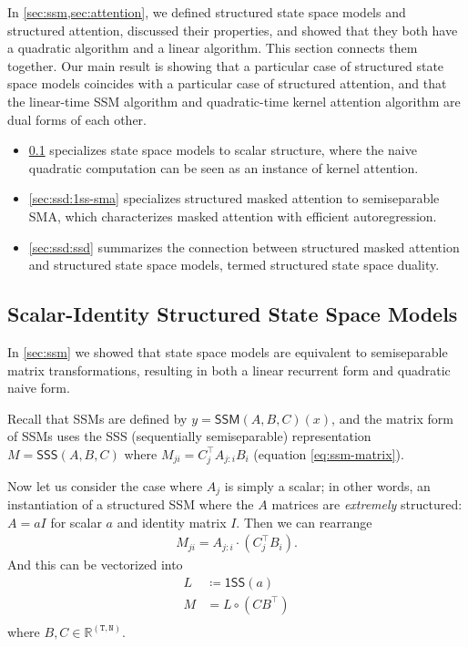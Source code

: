 \documentclass{article}
\newcommand{\R}{\mathbb{R}}
\begin{document}
In \cref{sec:ssm,sec:attention}, we defined structured state space models and structured attention,
discussed their properties, and showed that they both have a quadratic algorithm and a linear algorithm.
This section connects them together.
Our main result is showing that a particular case of structured state space models coincides with a particular case of structured attention,
and that the linear-time SSM algorithm and quadratic-time kernel attention algorithm are dual forms of each other.
\begin{itemize}
  \item \cref{sec:ssd:quadratic-ssm} specializes state space models to scalar structure, where the naive quadratic computation can be seen as an instance of kernel attention.
  \item \cref{sec:ssd:1ss-sma} specializes structured masked attention to semiseparable SMA, which characterizes masked attention with efficient autoregression.
  \item \cref{sec:ssd:ssd} summarizes the connection between structured masked attention and structured state space models, termed structured state space duality.
\end{itemize}

\subsection{Scalar-Identity Structured State Space Models}
\label{sec:ssd:quadratic-ssm}

In \cref{sec:ssm} we showed that state space models are equivalent to semiseparable matrix transformations,
resulting in both a linear recurrent form and quadratic naive form.

Recall that SSMs are defined by $y = \mathsf{SSM}(A, B, C)(x)$, and the matrix form of SSMs uses the SSS (sequentially semiseparable) representation
$M = \mathsf{SSS}(A, B, C)$ where
$M_{ji} = C_j^{\top} A_{j:i} B_i$ (equation \eqref{eq:ssm-matrix}).

Now let us consider the case where $A_j$ is simply a scalar;
in other words, an instantiation of a structured SSM where the $A$ matrices are \emph{extremely} structured: $A = aI$ for scalar $a$ and identity matrix $I$.
Then we can rearrange
\begin{align*}
  M_{ji} = A_{j:i} \cdot (C_j^{\top}B_i)
.
\end{align*}
And this can be vectorized into
\begin{align*}
  L &\coloneqq \mathsf{1SS}(a) \\
  M &= L \circ (C B^{\top}) \\
\end{align*}
where $B, C \in \R^{\mathtt{(T,N)}}$.
\end{document}
